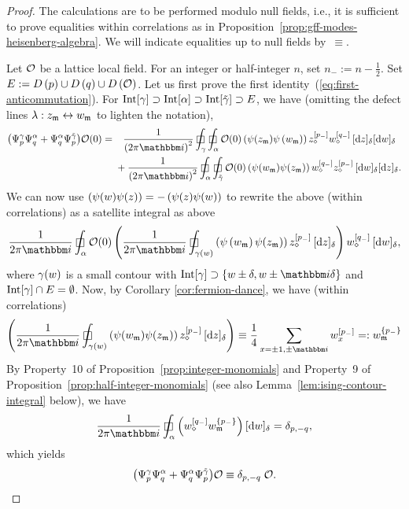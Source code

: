 \documentclass[12pt,oneside,english]{amsart}
\numberwithin{equation}{section}
\numberwithin{figure}{section}
\theoremstyle{plain}
\theoremstyle{plain}
\theoremstyle{plain}
\theoremstyle{plain}
\theoremstyle{remark}
\theoremstyle{definition}
\theoremstyle{plain}
\theoremstyle{plain}
\numberwithin{thm}{section}
\begin{document}
\begin{proof}
The calculations are to be performed modulo null fields, i.e., it is sufficient 
to prove equalities within correlations as in
Proposition~\ref{prop:gff-modes-heisenberg-algebra}. We will indicate 
equalities up to null fields by~$\equiv$.

Let ${\mathcal{O}}$ be a lattice local field. For an integer or half-integer
$n$, set $n_{-} := n-\frac{1}{2}$. Set $E := D\left(p\right)\cup 
D\left(q\right)\cup 
D\left({\mathcal{O}}\right)$.
Let us first prove the first identity~(\ref{eq:first-anticommutation}).
For $\mathrm{Int}[{\gamma}]\supset \mathrm{Int}[{\alpha}]\supset 
\mathrm{Int}[{{\tilde{\gamma}}}]\supset E$,
we have (omitting the defect lines
${\lambda}:z_{\mathfrak{m}}\leftrightarrow w_{\mathfrak{m}}$ to
lighten the notation), 
\begin{align*}
\big( \fermmode^{\contour}_{p} \fermmode^{\contourbis}_{q} + 
    \fermmode^{\contourbis}_{q} \fermmode^{\tilde{\contour}}_{p}
    \big) \genoper(0) 
= \; & \phantom{+} \frac{1}{\left(2\pi \ii \right)^{2}}
  \dcint{\contour} \dcint{\contourbis} 
  \genoper(0) 
  \left(\ferm(z_{\mdl}) \ferm\left(w_{\mdl} \right)\right)
	\dmon{z_{\dmd}}{p_{-}}
    \dmon{w_{\dmd}}{q_{-}}
  \, \dd{z} \dd{w}\\
& + \frac{1}{\left(2\pi \ii \right)^{2}}
  \dcint{\contourbis} \dcint{{\tilde{\contour}}}
  \genoper(0) 
  \left(\ferm(w_{\mdl}) \ferm(z_{\mdl}) \right)
	\dmon{w_{\dmd}}{q_{-}}
	\dmon{z_{\dmd}}{p_{-}}
  \, \dd{w} \dd{z}.
\end{align*}
We can now use 
$\left({\psi}(w)  {\psi}(z) \right)
= - \left({\psi}(z)  {\psi}(w) \right)$
to rewrite the above (within correlations)
as a satellite integral as above 
\[
\frac{1}{2\pi \ii }\dcint{\contourbis} 
  \genoper(0) 
  \left(\frac{1}{2\pi \ii }
\dcint{\contour(w)}
  \left(\ferm\left(w_{\mdl} \right)
    \ferm(z_{\mdl}) \right)
  \dmon{z_{\dmd}}{p_{-}}
  \, \dd{z} \right)
  \dmon{w_{\dmd}}{q_{-}}
  \, \dd{w},
\]
where $\gamma(w) $ is a small contour with
$\interior{\contour} \supset \set{ w \pm \meshsz , w \pm \ii \meshsz }$
and $\mathrm{Int}[{\gamma}]\cap E=\emptyset$. Now, by Corollary 
\ref{cor:fermion-dance},
we have (within correlations) 
\[
\left(\frac{1}{2\pi \ii } \dcint{ \contour(w) }
\left( \ferm(w_{\mdl})  
\ferm(z_{\mdl})  \right)
	\dmon{z_{\dmd}}{p_{-}}
  \, \dd{z} \right)
\equiv \frac{1}{4}\sum_{x=\pm1,\pm \ii }
  \dmon{w_{x}}{p_{-}}
=: \dmonavg{w_{\mdl}}{p_{-}} %
\]
By Property~10 of Proposition~\ref{prop:integer-monomials} and Property~9 of 
Proposition~\ref{prop:half-integer-monomials} (see also 
Lemma~\ref{lem:ising-contour-integral} below), we have 
\[
\frac{1}{2\pi \ii } \dcint{\contourbis}  \left(
	\dmon{w_{\dmd}}{q_{-}}
    \dmonavg{w_{\mdl}}{p_{-}}
    \right)  \dd{w}
= \delta_{p,-q},
\]
which yields 
\[
\big( {\Psi}^{\gamma}_{p} {\Psi}^{\alpha}_{q} + 
    {\Psi}^{\alpha}_{q} {\Psi}^{\tilde{\gamma}}_{p}
    \big) {\mathcal{O}}
\equiv \delta_{p,-q} \; {\mathcal{O}} .
\]


\end{proof}
\end{document}
